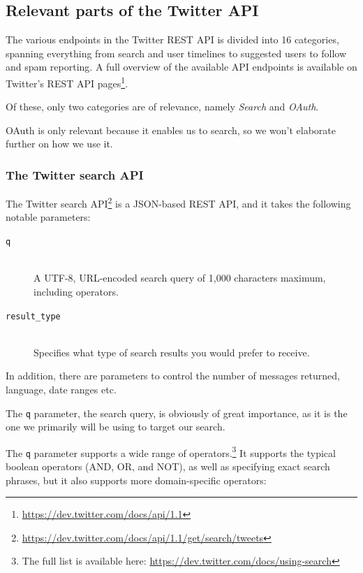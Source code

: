 
\subsection{Relevant parts of the Twitter API} %
\label{sub:relevant_parts_of_the_twitter_api}

The various endpoints in the Twitter REST API is divided into 16 categories, spanning everything from search and user timelines to suggested users to follow and spam reporting. A full overview of the available API endpoints is available on Twitter's REST API pages\footnote{\url{https://dev.twitter.com/docs/api/1.1}}.

Of these, only two categories are of relevance, namely \emph{Search} and \emph{OAuth}.

OAuth is only relevant because it enables us to search, so we won't elaborate further on how we use it.

\subsubsection{The Twitter search API}
\label{ssec:search_api}

The Twitter search API\footnote{\url{https://dev.twitter.com/docs/api/1.1/get/search/tweets}} is a JSON-based REST API, and it takes the following notable parameters:

\begin{description}
  \item[\texttt{q}] \hfill \\
    A UTF-8, URL-encoded search query of 1,000 characters maximum, including operators.
  \item[\texttt{result\_type}] \hfill \\
    Specifies what type of search results you would prefer to receive.
\end{description}

In addition, there are parameters to control the number of messages returned, language, date ranges etc.

The \texttt{q} parameter, the search query, is obviously of great importance, as it is the one we primarily will be using to target our search.

The \texttt{q} parameter supports a wide range of operators.\footnote{The full list is available here: \url{https://dev.twitter.com/docs/using-search}} It supports the typical boolean operators (AND, OR, and NOT), as well as specifying exact search phrases, but it also supports more domain-specific operators:

